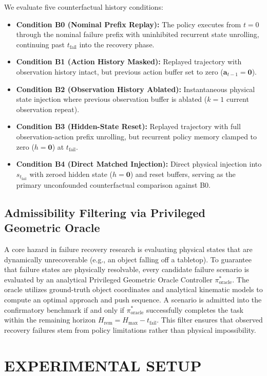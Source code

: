 \documentclass[letterpaper, 10 pt, conference]{ieeeconf}
\begin{document}
We evaluate five counterfactual history conditions:
\begin{itemize}
    \item \textbf{Condition B0 (Nominal Prefix Replay):} The policy executes from $t=0$ through the nominal failure prefix with uninhibited recurrent state unrolling, continuing past $t_{\text{fail}}$ into the recovery phase.
    \item \textbf{Condition B1 (Action History Masked):} Replayed trajectory with observation history intact, but previous action buffer set to zero ($\mathbf{a}_{t-1} = \mathbf{0}$).
    \item \textbf{Condition B2 (Observation History Ablated):} Instantaneous physical state injection where previous observation buffer is ablated ($k=1$ current observation repeat).
    \item \textbf{Condition B3 (Hidden-State Reset):} Replayed trajectory with full observation-action prefix unrolling, but recurrent policy memory clamped to zero ($h = \mathbf{0}$) at $t_{\text{fail}}$.
    \item \textbf{Condition B4 (Direct Matched Injection):} Direct physical injection into $s_{t_{\text{fail}}}$ with zeroed hidden state ($h = \mathbf{0}$) and reset buffers, serving as the primary unconfounded counterfactual comparison against B0.
\end{itemize}

\subsection{Admissibility Filtering via Privileged Geometric Oracle}
A core hazard in failure recovery research is evaluating physical states that are dynamically unrecoverable (e.g., an object falling off a tabletop). To guarantee that failure states are physically resolvable, every candidate failure scenario is evaluated by an analytical Privileged Geometric Oracle Controller $\pi^*_{\text{oracle}}$. The oracle utilizes ground-truth object coordinates and analytical kinematic models to compute an optimal approach and push sequence. A scenario is admitted into the confirmatory benchmark if and only if $\pi^*_{\text{oracle}}$ successfully completes the task within the remaining horizon $H_{\text{rem}} = H_{\text{max}} - t_{\text{fail}}$. This filter ensures that observed recovery failures stem from policy limitations rather than physical impossibility.

\section{EXPERIMENTAL SETUP}
\label{sec:benchmark_suite}
\end{document}
